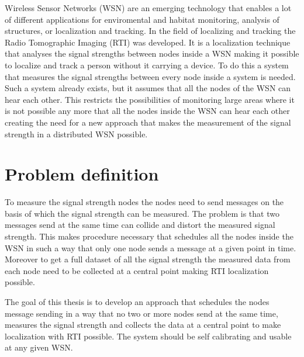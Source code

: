 

Wireless Sensor Networks (WSN) are an emerging technology that enables a lot of different applications for enviromental and habitat monitoring, analysis of structures, or localization and tracking. In the field of localizing and tracking the Radio Tomographic Imaging (RTI) was developed. It is a localization technique that analyses the signal strengths between nodes inside a WSN making it possible to localize and track a person without it carrying a device. To do this a system that measures the signal strengths between every node inside a system is needed. Such a system already exists, but it assumes that all the nodes of the WSN can hear each other. This restricts the possibilities of monitoring large areas where it is not possible any more that all the nodes inside the WSN can hear each other creating the need for a new approach that makes the measurement of the signal strength in a distributed WSN possible. 

\section{Problem definition}
To measure the signal strength nodes the nodes need to send messages on the basis of which the signal strength can be measured. The problem is that two messages send at the same time can collide and distort the measured signal strength. This makes procedure necessary that schedules all the nodes inside the WSN in such a way that only one node sends a message at a given point in time. Moreover to get a full dataset of all the signal strength the measured data from each node need to be collected at a central point making RTI localization possible.

The goal of this thesis is to develop an approach that schedules the nodes message sending in a way that no two or more nodes send at the same time, measures the signal strength and collects the data at a central point to make localization with RTI possible. The system should be self calibrating and usable at any given WSN.    

